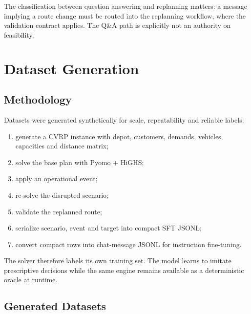 \documentclass[11pt,a4paper]{article}
\begin{document}
The classification between question answering and replanning matters: a message implying a route
change must be routed into the replanning workflow, where the validation contract applies. The Q\&A
path is explicitly not an authority on feasibility.

\section{Dataset Generation}

\subsection{Methodology}

Datasets were generated synthetically for scale, repeatability and reliable labels:

\begin{enumerate}
  \item generate a CVRP instance with depot, customers, demands, vehicles, capacities and distance
        matrix;
  \item solve the base plan with Pyomo + HiGHS;
  \item apply an operational event;
  \item re-solve the disrupted scenario;
  \item validate the replanned route;
  \item serialize scenario, event and target into compact SFT JSONL;
  \item convert compact rows into chat-message JSONL for instruction fine-tuning.
\end{enumerate}

The solver therefore labels its own training set. The model learns to imitate prescriptive decisions
while the same engine remains available as a deterministic oracle at runtime.

\subsection{Generated Datasets}
\end{document}
